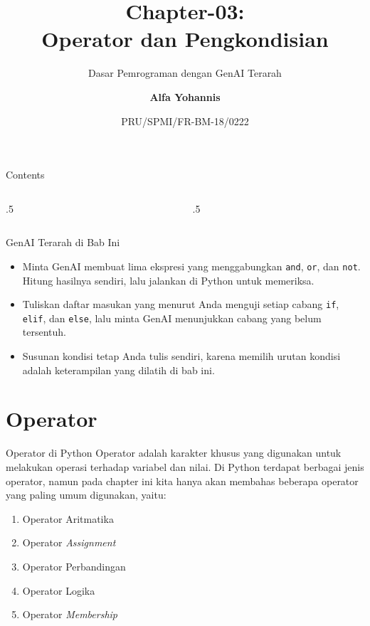 \documentclass[aspectratio=169, table]{beamer}
\subtitle{Dasar Pemrograman dengan GenAI Terarah}
\title{Chapter-03:\\\LARGE{Operator dan Pengkondisian\\}
\vspace{10pt}}
\date[Serial]{\scriptsize {PRU/SPMI/FR-BM-18/0222}}
\author[Pradita]{\small{\textbf{Alfa Yohannis}}}
\begin{document}
\frame{\titlepage}

\begin{frame}[fragile]{Contents}
\vspace{15pt}
\begin{columns}[t]
\begin{column}{.5\textwidth}
\tableofcontents[sections={1}]
\end{column}
\begin{column}{.5\textwidth}
\tableofcontents[sections={2-4}]
\end{column}
\end{columns}
\end{frame}

\begin{frame}{GenAI Terarah di Bab Ini}
\small
\begin{itemize}
  \item Minta GenAI membuat lima ekspresi yang menggabungkan \texttt{and}, \texttt{or}, dan \texttt{not}. Hitung hasilnya sendiri, lalu jalankan di Python untuk memeriksa.
  \item Tuliskan daftar masukan yang menurut Anda menguji setiap cabang \texttt{if}, \texttt{elif}, dan \texttt{else}, lalu minta GenAI menunjukkan cabang yang belum tersentuh.
  \item Susunan kondisi tetap Anda tulis sendiri, karena memilih urutan kondisi adalah keterampilan yang dilatih di bab ini.
\end{itemize}
\end{frame}

\section{Operator}

\begin{frame}{Operator di Python}
Operator adalah karakter khusus yang digunakan untuk melakukan operasi terhadap variabel dan nilai. Di Python terdapat berbagai jenis operator, namun pada chapter ini kita hanya akan membahas beberapa operator yang paling umum digunakan, yaitu:

\begin{enumerate}
    \item Operator Aritmatika
    \item Operator \textit{Assignment}
    \item Operator Perbandingan
    \item Operator Logika
    \item Operator \textit{Membership}
\end{enumerate}
\end{frame}
\end{document}
